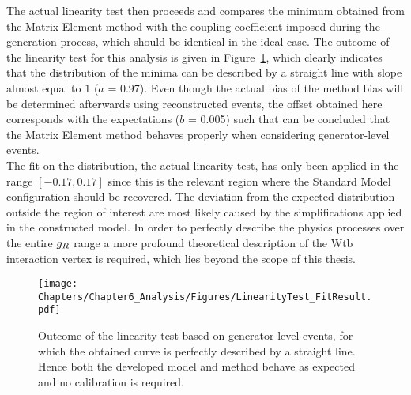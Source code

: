 The actual linearity test then proceeds and compares the minimum obtained from the Matrix Element method with the coupling coefficient imposed during the generation process, which should be identical in the ideal case.
The outcome of the linearity test for this analysis is given in Figure~\ref{fig::CalibCurve}, which clearly indicates that the distribution of the minima can be described by a straight line with slope almost equal to $1$ ($a$ = 0.97). Even though the actual bias of the method bias will be determined afterwards using reconstructed events, the offset obtained here corresponds with the expectations ($b$ = 0.005) such that can be concluded that the Matrix Element method behaves properly when considering generator-level events.
\\
The fit on the distribution, the actual linearity test, has only been applied in the range $\left[-0.17, 0.17\right]$ since this is the relevant region where the Standard Model configuration should be recovered. 
The deviation from the expected distribution outside the region of interest are most likely caused by the simplifications applied in the constructed model. In order to perfectly describe the physics processes over the entire $g_{R}$ range a more profound theoretical description of the Wtb interaction vertex is required, which lies beyond the scope of this thesis.
\begin{figure}[h!t]
 \centering
 \texttt{[image: Chapters/Chapter6\_Analysis/Figures/LinearityTest\_FitResult.pdf]}
 \caption{Outcome of the linearity test based on generator-level events, for which the obtained curve is perfectly described by a straight line. Hence both the developed model and method behave as expected and no calibration is required.} \label{fig::CalibCurve}
\end{figure}
%

